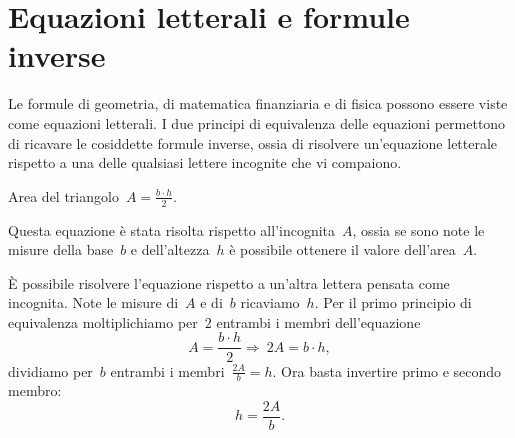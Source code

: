 % 
% 

\section{Equazioni letterali e formule inverse}
\label{sec:compl1_formuleinverse}

Le formule di geometria, di matematica finanziaria e di fisica possono 
essere viste come equazioni letterali.
I due principi di equivalenza delle equazioni permettono di ricavare le 
cosiddette formule inverse, ossia di risolvere
un'equazione letterale rispetto a una delle qualsiasi lettere incognite 
che vi compaiono.

 \begin{esempio}{}{}
Area del triangolo~\(A=\frac{b\cdot h}{2}\).

Questa equazione è stata risolta rispetto all'incognita~\(A\), ossia se 
sono note le misure della base~\(b\) e dell'altezza~\(h\)
è possibile ottenere il valore dell'area~\(A\).

È possibile risolvere l'equazione rispetto a un'altra lettera pensata come 
incognita.
Note le misure di~\(A\) e di~\(b\) ricaviamo~\(h\). Per il primo principio 
di equivalenza moltiplichiamo per~\(2\)
entrambi i membri dell'equazione
\[A=\frac{b\cdot h}{2}\Rightarrow~2A=b\cdot h,\]
dividiamo per~\(b\) entrambi i membri~\(\frac{2A}{b}=h\).
Ora basta invertire primo e secondo membro: \[h=\frac{2A}{b}.\]
\end{esempio}


